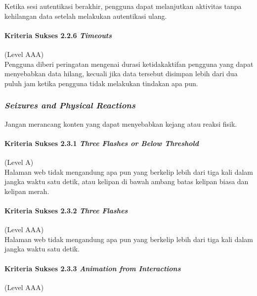 Ketika sesi autentikasi berakhir, pengguna dapat melanjutkan aktivitas tanpa kehilangan data setelah melakukan autentikasi ulang.

\paragraph{Kriteria Sukses 2.2.6 \textit{Timeouts}}
\label{sec:kriteria_sukses_2.2.6}
(Level AAA)\\

Pengguna diberi peringatan mengenai durasi ketidakaktifan pengguna yang dapat menyebabkan data hilang, kecuali jika data tersebut disimpan lebih dari dua puluh jam ketika pengguna tidak melakukan tindakan apa pun.

\subsubsection{\textit{Seizures and Physical Reactions}}
\label{sec:seizures_and_physical_reactions}
Jangan merancang konten yang dapat menyebabkan kejang atau reaksi fisik.

\paragraph{Kriteria Sukses 2.3.1 \textit{Three Flashes or Below Threshold}}
\label{sec:kriteria_sukses_2.3.1}
(Level A)\\

Halaman web tidak mengandung apa pun yang berkelip lebih dari tiga kali dalam jangka waktu satu detik, atau kelipan di bawah ambang batas kelipan biasa dan kelipan merah.

\paragraph{Kriteria Sukses 2.3.2 \textit{Three Flashes}}
\label{sec:kriteria_sukses_2.3.2}
(Level AAA)\\

Halaman web tidak mengandung apa pun yang berkelip lebih dari tiga kali dalam jangka waktu satu detik.

\paragraph{Kriteria Sukses 2.3.3 \textit{Animation from Interactions}}
\label{sec:kriteria_sukses_2.3.3}
(Level AAA)\\


